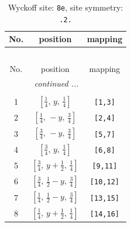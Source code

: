 \documentclass[fleqn,8pt]{jsarticle}
\begin{document}
\begin{longtable}{ccc}
\caption{Wyckoff site: {\tt 8e}, site symmetry: {\tt .2.}}
 \\
 \hline \hline
No. & position & mapping \\ \hline \endfirsthead

\multicolumn{2}{l}{\tablename\ \thetable{}} \\
 \hline \hline
No. & position & mapping \\ \hline \endhead

 \hline \hline
\multicolumn{2}{r}{\footnotesize\it continued ...} \\ \endfoot

 \hline \hline
\multicolumn{2}{r}{} \\ \endlastfoot

1 & $\left[ \frac{1}{4},\, y,\, \frac{1}{4} \right]$ & {\tt [1,3]} \\ \hline
2 & $\left[ \frac{1}{4},\, - y,\, \frac{3}{4} \right]$ & {\tt [2,4]} \\ \hline
3 & $\left[ \frac{3}{4},\, - y,\, \frac{3}{4} \right]$ & {\tt [5,7]} \\ \hline
4 & $\left[ \frac{3}{4},\, y,\, \frac{1}{4} \right]$ & {\tt [6,8]} \\ \hline
5 & $\left[ \frac{3}{4},\, y + \frac{1}{2},\, \frac{1}{4} \right]$ & {\tt [9,11]} \\ \hline
6 & $\left[ \frac{3}{4},\, \frac{1}{2} - y,\, \frac{3}{4} \right]$ & {\tt [10,12]} \\ \hline
7 & $\left[ \frac{1}{4},\, \frac{1}{2} - y,\, \frac{3}{4} \right]$ & {\tt [13,15]} \\ \hline
8 & $\left[ \frac{1}{4},\, y + \frac{1}{2},\, \frac{1}{4} \right]$ & {\tt [14,16]} \\
\end{longtable}
\renewcommand{\arraystretch}{1.2}
\end{document}
